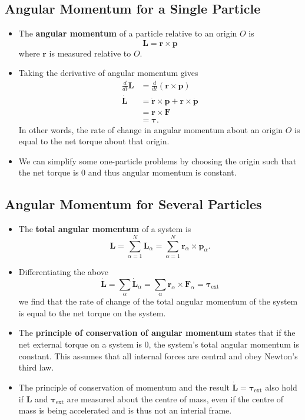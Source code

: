 \documentclass{article}
\renewcommand{\vec}[1]{\boldsymbol{\mathbf{#1}}}
\newcommand{\dvec}[1]{\dot{\vec{#1}}}
\begin{document}
\subsection{Angular Momentum for a Single Particle}

\begin{itemize}
  \item The \textbf{angular momentum} of a particle relative to an origin $O$ is \[\vec{L} = \vec{r} \times \vec{p}\] where $\vec{r}$ is measured relative to $O$.

  \item Taking the derivative of angular momentum gives \begin{align*}
          \frac{d}{d t} \vec{L} & = \frac{d}{d t} (\vec{r} \times \vec{p})            \\
          \dvec{L}              & = \dvec{r} \times \vec{p} + \vec{r} \times \dvec{p} \\
                                & = \vec{r} \times \vec{F}                            \\
                                & = \vec{\tau}.
        \end{align*} In other words, the rate of change in angular momentum about an origin $O$ is equal to the net torque about that origin.

  \item We can simplify some one-particle problems by choosing the origin such that the net torque is $0$ and thus angular momentum is constant.
\end{itemize}

\subsection{Angular Momentum for Several Particles}

\begin{itemize}
  \item The \textbf{total angular momentum} of a system is \[\vec{L} = \sum_{\alpha = 1}^N \vec{L}_\alpha = \sum_{\alpha = 1}^N \vec{r}_\alpha \times \vec{p}_\alpha.\]

  \item Differentiating the above \[\dvec{L} = \sum_\alpha \dvec{L}_\alpha = \sum_\alpha \vec{r}_\alpha \times \vec{F}_\alpha = \vec{\tau}_\text{ext}\] we find that the rate of change of the total angular momentum of the system is equal to the net torque on the system.

  \item The \textbf{principle of conservation of angular momentum} states that if the net external torque on a system is $0$, the system's total angular momentum is constant. This assumes that all internal forces are central and obey Newton's third law.

  \item The principle of conservation of momentum and the result $\dvec{L} = \vec{\tau}_\text{ext}$ also hold if $\vec{L}$ and $\vec{\tau}_\text{ext}$ are measured about the centre of mass, even if the centre of mass is being accelerated and is thus not an interial frame.
\end{itemize}
\end{document}
